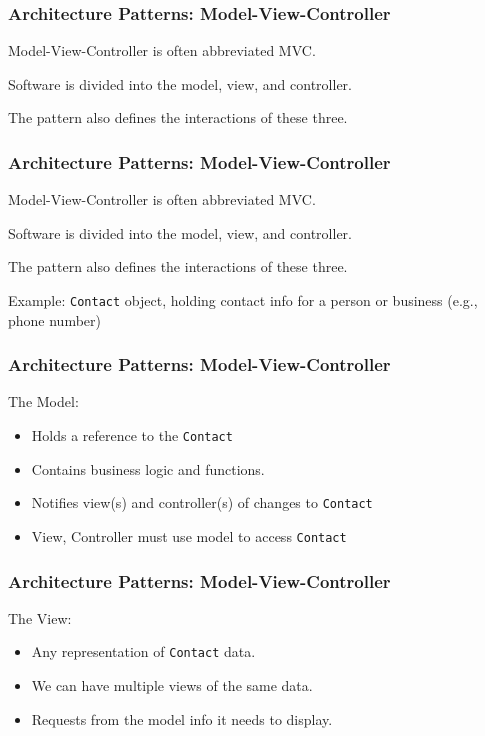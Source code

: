 \begin{frame}
\frametitle{Architecture Patterns: Model-View-Controller}

\begin{changemargin}{1cm}
Model-View-Controller is often abbreviated MVC.

Software is divided into the model, view, and controller.

The pattern also defines the interactions of these three.

\end{changemargin}
\end{frame}

\begin{frame}
\frametitle{Architecture Patterns: Model-View-Controller}

\begin{changemargin}{1cm}
Model-View-Controller is often abbreviated MVC.

Software is divided into the model, view, and controller.

The pattern also defines the interactions of these three.

Example: \texttt{Contact} object, holding contact info for a person or business (e.g., phone number)

\end{changemargin}
\end{frame}

\begin{frame}
\frametitle{Architecture Patterns: Model-View-Controller}

\begin{changemargin}{1cm}
The Model:
\begin{itemize}
	\item Holds a reference to the \texttt{Contact}
	\item Contains business logic and functions.
	\item Notifies view(s) and controller(s) of changes to \texttt{Contact}
	\item View, Controller must use model to access \texttt{Contact}
\end{itemize}

\end{changemargin}
\end{frame}

\begin{frame}
\frametitle{Architecture Patterns: Model-View-Controller}

\begin{changemargin}{1cm}
The View:
\begin{itemize}
	\item Any representation of \texttt{Contact} data.
	\item We can have multiple views of the same data.
	\item Requests from the model info it needs to display.
\end{itemize}

\end{changemargin}
\end{frame}


